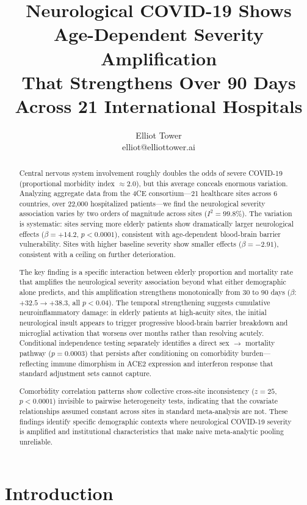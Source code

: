 \documentclass{article}
\title{Neurological COVID-19 Shows Age-Dependent Severity Amplification\\That Strengthens Over 90 Days Across 21 International Hospitals}
\author{\name Elliot Tower \\
      \email elliot@elliottower.ai}
\begin{document}
\maketitle

\begin{abstract}
Central nervous system involvement roughly doubles the odds of severe COVID-19 (proportional morbidity index $\approx 2.0$), but this average conceals enormous variation.
Analyzing aggregate data from the 4CE consortium---21 healthcare sites across 6 countries, over 22,000 hospitalized patients---we find the neurological severity association varies by two orders of magnitude across sites ($I^2 = 99.8\%$).
The variation is systematic: sites serving more elderly patients show dramatically larger neurological effects ($\beta = +14.2$, $p < 0.0001$), consistent with age-dependent blood-brain barrier vulnerability.
Sites with higher baseline severity show smaller effects ($\beta = -2.91$), consistent with a ceiling on further deterioration.

The key finding is a specific interaction between elderly proportion and mortality rate that amplifies the neurological severity association beyond what either demographic alone predicts, and this amplification strengthens monotonically from 30 to 90 days ($\beta$: $+32.5 \to +38.3$, all $p < 0.04$).
The temporal strengthening suggests cumulative neuroinflammatory damage: in elderly patients at high-acuity sites, the initial neurological insult appears to trigger progressive blood-brain barrier breakdown and microglial activation that worsens over months rather than resolving acutely.
Conditional independence testing separately identifies a direct sex $\to$ mortality pathway ($p = 0.0003$) that persists after conditioning on comorbidity burden---reflecting immune dimorphism in ACE2 expression and interferon response that standard adjustment sets cannot capture.

Comorbidity correlation patterns show collective cross-site inconsistency ($z = 25$, $p < 0.0001$) invisible to pairwise heterogeneity tests, indicating that the covariate relationships assumed constant across sites in standard meta-analysis are not.
These findings identify specific demographic contexts where neurological COVID-19 severity is amplified and institutional characteristics that make naive meta-analytic pooling unreliable.
\end{abstract}


\section{Introduction}
\end{document}
